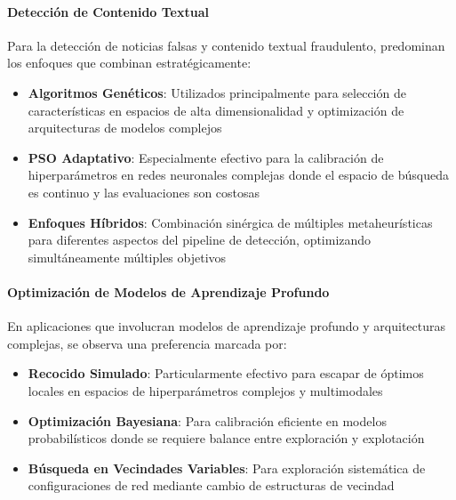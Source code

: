 \paragraph{Detección de Contenido Textual}
Para la detección de noticias falsas y contenido textual fraudulento, predominan los enfoques que combinan estratégicamente:
\begin{itemize}
    \item \textbf{Algoritmos Genéticos}: Utilizados principalmente para selección de características en espacios de alta dimensionalidad y optimización de arquitecturas de modelos complejos \cite{aqil2021modeling, hidayattullah2020financial}
    \item \textbf{PSO Adaptativo}: Especialmente efectivo para la calibración de hiperparámetros en redes neuronales complejas donde el espacio de búsqueda es continuo y las evaluaciones son costosas \cite{deshai2023unmasking, bacanin2023benefits}
    \item \textbf{Enfoques Híbridos}: Combinación sinérgica de múltiples metaheurísticas para diferentes aspectos del pipeline de detección, optimizando simultáneamente múltiples objetivos \cite{yildirim2023novel}
\end{itemize}

\paragraph{Optimización de Modelos de Aprendizaje Profundo}
En aplicaciones que involucran modelos de aprendizaje profundo y arquitecturas complejas, se observa una preferencia marcada por:
\begin{itemize}
    \item \textbf{Recocido Simulado}: Particularmente efectivo para escapar de óptimos locales en espacios de hiperparámetros complejos y multimodales \cite{bacanin2023benefits}
    \item \textbf{Optimización Bayesiana}: Para calibración eficiente en modelos probabilísticos donde se requiere balance entre exploración y explotación \cite{horak2023gaussian}
    \item \textbf{Búsqueda en Vecindades Variables}: Para exploración sistemática de configuraciones de red mediante cambio de estructuras de vecindad \cite{kapunac2023variable}
\end{itemize}

